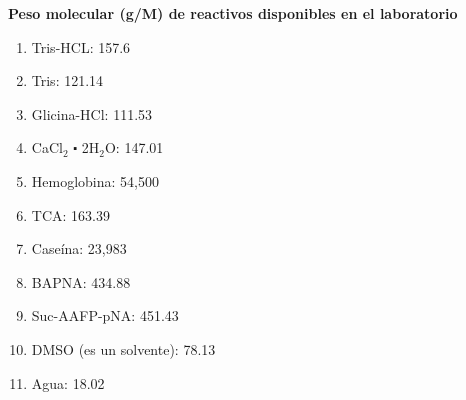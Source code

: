 \documentclass[12pt,a4paper]{article}
\begin{document}
\begin{multicols}{2}
\begin{Exercice}\textbf{Peso molecular (g/M) de reactivos disponibles en el laboratorio}
	\begin{enumerate}[1)]
		\item Tris-HCL: 157.6 
		\item Tris: 121.14 
		\item Glicina-HCl: 111.53
		\item CaCl$_2$ $\centerdot$ 2H$_2$O: 147.01
		\item Hemoglobina: 54,500
		\item TCA: 163.39
		\item Case\'ina: 23,983
		\item BAPNA: 434.88
		\item Suc-AAFP-pNA: 451.43
		\item DMSO (es un solvente): 78.13
		\item Agua: 18.02 
	\end{enumerate}
\end{Exercice}

\end{multicols}
\end{document}
